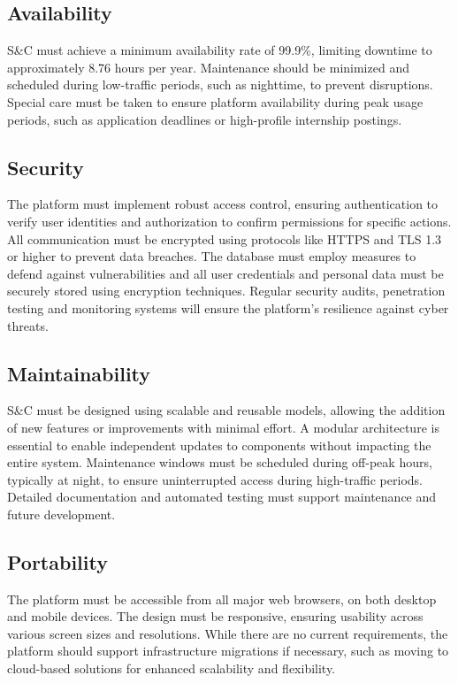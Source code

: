 \subsection{Availability}
S\&C must achieve a minimum availability rate of 99.9\%, limiting downtime to approximately 8.76 hours per year.
Maintenance should be minimized and scheduled during low-traffic periods, such as nighttime, to prevent disruptions.
Special care must be taken to ensure platform availability during peak usage periods, such as application deadlines or high-profile internship postings.

\subsection{Security}
The platform must implement robust access control, ensuring authentication to verify user identities and authorization to confirm permissions for specific actions.
All communication must be encrypted using protocols like HTTPS and TLS 1.3 or higher to prevent data breaches.
The database must employ measures to defend against vulnerabilities and all user credentials and personal data must be securely stored using encryption techniques.
Regular security audits, penetration testing and monitoring systems will ensure the platform's resilience against cyber threats.

\subsection{Maintainability}
S\&C must be designed using scalable and reusable models, allowing the addition of new features or improvements with minimal effort.
A modular architecture is essential to enable independent updates to components without impacting the entire system.
Maintenance windows must be scheduled during off-peak hours, typically at night, to ensure uninterrupted access during high-traffic periods.
Detailed documentation and automated testing must support maintenance and future development.

\subsection{Portability}
The platform must be accessible from all major web browsers, on both desktop and mobile devices.
The design must be responsive, ensuring usability across various screen sizes and resolutions.
While there are no current requirements, the platform should support infrastructure migrations if necessary, such as moving to cloud-based solutions for enhanced scalability and flexibility.
